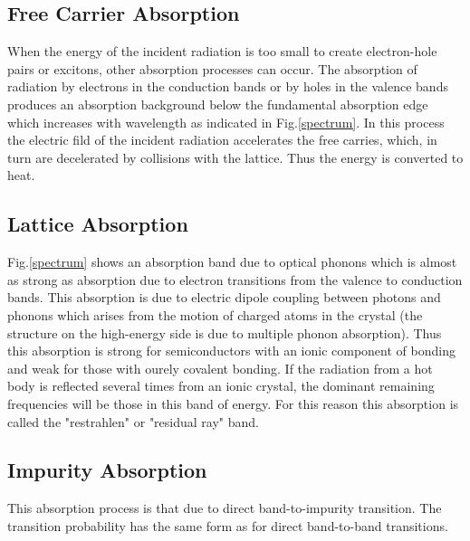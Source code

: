 \documentclass[%
reprint,
amsmath,amssymb,
aps,
]{revtex4-1}
\begin{document}
	\subsection*{Free Carrier Absorption}
	
	When the energy of the incident radiation is too small to create electron-hole pairs or excitons, other absorption processes can occur. The absorption of radiation by electrons in the conduction bands or by holes in the valence bands produces an absorption background below the fundamental absorption edge which increases with wavelength as indicated in Fig.\ref{spectrum}. In this process the electric fild of the incident radiation accelerates the free carries, which, in turn are decelerated by collisions with the lattice. Thus the energy is converted to heat.
	
	
    \subsection*{Lattice Absorption}
	
	Fig.\ref{spectrum} shows an absorption band due to optical phonons which is almost as strong as absorption due to electron transitions from the valence to conduction bands. This absorption is due to electric dipole coupling between photons and phonons which arises from the motion of charged atoms in the crystal (the structure on the high-energy side is due to multiple phonon absorption). Thus this absorption is strong for semiconductors with an ionic component of bonding and weak for those with ourely covalent bonding. If the radiation from a hot body is reflected several times from an ionic crystal, the dominant remaining frequencies will be those in this band of energy. For this reason this absorption is called the "restrahlen" or "residual ray" band.
	
	
	
	
	
	
	
\subsection*{Impurity Absorption}
	This absorption process is that due to direct band-to-impurity transition. The transition probability has the same form as for direct band-to-band transitions.
	
\end{document}
